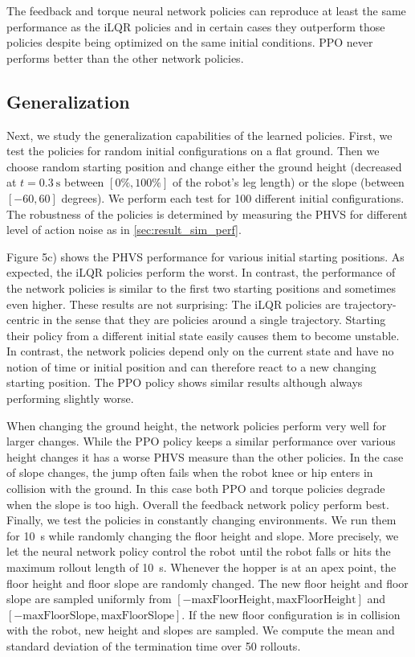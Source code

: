 The feedback and torque neural network policies can reproduce at least
the same performance as the iLQR policies and in certain cases they outperform those policies despite being optimized on the same initial conditions. PPO never performs better than the other network policies.
%
\vspace{-0.3cm}
\subsection{Generalization}
Next, we study the generalization capabilities of the learned policies.
First, we test the policies for random initial configurations on a flat ground.
Then we choose random starting position and change either the ground height (decreased at $t=\SI{0.3}{\second}$ between $[0\%, 100\%]$ of the robot's leg length) or
the slope (between $[-60,60]$ degrees). We perform each test for 100 different initial configurations. The robustness of the policies is determined by measuring the PHVS for different level of action noise as in \cref{sec:result_sim_perf}.
%

Figure 5c) shows the PHVS performance for various initial
starting positions. As expected, the iLQR policies perform the worst.
In contrast, the performance of the network policies is similar to the first two starting positions and sometimes even higher. These results are not surprising: The iLQR policies are trajectory-centric
in the sense that they are policies around a single trajectory. Starting their policy from a different initial state easily causes them to become unstable. In contrast, the network policies depend only on the current state and have no notion of time or initial position and can therefore react to a new changing starting position. The PPO policy shows similar results although always performing slightly worse.

When changing the ground height, the network policies perform very well for larger changes. While the PPO policy keeps a similar performance over various height changes it has a worse PHVS measure than the other policies. In the case of slope changes,
the jump often fails when the robot knee or hip enters in collision with the ground. In this case both PPO and torque policies degrade when the slope is too high.
Overall the feedback network policy perform best.
%
Finally, we test the policies in constantly changing environments.
We run them for \SI{10}{\second} while randomly changing the floor height and slope. More precisely, we let the neural network policy control the robot until the robot falls or hits the maximum rollout length of \SI{10}{\second}. Whenever the hopper is at an apex point, the floor height and floor slope are randomly changed. The new floor height and floor slope are sampled uniformly from $[-\text{maxFloorHeight}, \text{maxFloorHeight}]$ and $[-\text{maxFloorSlope}, \text{maxFloorSlope}]$. If the new floor configuration is in collision with the robot, new height and slopes are sampled. We compute the mean and standard deviation of the termination time over 50 rollouts.

